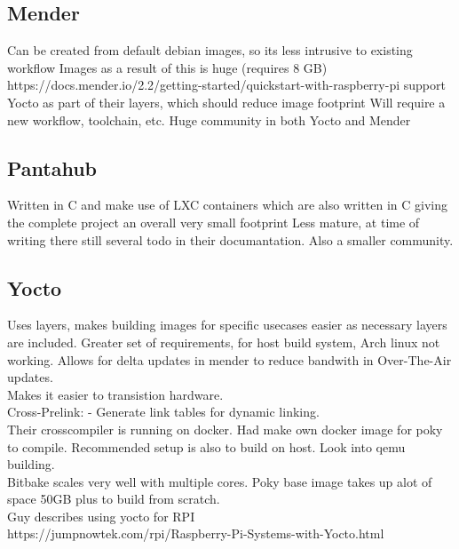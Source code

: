 \documentclass[../../main.tex]{subfiles}
\begin{document}
	

\subsection*{Mender}%
\label{sub:mender}

Can be created from default debian images, so its less intrusive to
existing workflow
Images as a result of this is huge (requires 8 GB)
https://docs.mender.io/2.2/getting-started/quickstart-with-raspberry-pi
support Yocto as part of their layers, which should reduce image footprint
Will require a new workflow, toolchain, etc.
Huge community in both Yocto and Mender

\subsection*{Pantahub}%
\label{sub:pantahub}

Written in C and make use of LXC containers which are also written in C giving
the complete project an overall very small footprint
Less mature, at time of writing there still several todo in their documantation.
Also a smaller community.

\subsection*{Yocto}%
\label{sub:yocto}

Uses layers, makes building images for specific usecases easier as necessary layers are included.
Greater set of requirements, for host build system, Arch linux not working.
Allows for delta updates in mender to reduce bandwith in Over-The-Air  updates.\\
Makes it easier to transistion hardware.\\
Cross-Prelink: - Generate link tables for dynamic linking.\\


Their crosscompiler is running on docker. Had make own docker image for poky to compile.
Recommended setup is also to build on host. Look into qemu building.\\
Bitbake scales very well with multiple cores.
Poky base image takes up alot of space 50GB plus to build from scratch.\\

Guy describes using yocto for RPI\\
https://jumpnowtek.com/rpi/Raspberry-Pi-Systems-with-Yocto.html\\
\end{document}
